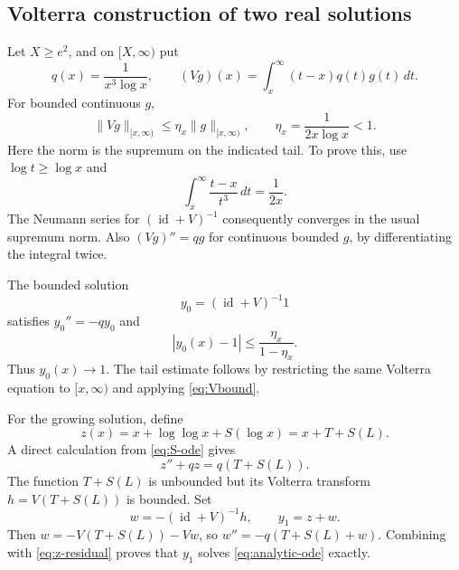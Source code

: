\documentclass[11pt,a4paper]{article}
\numberwithin{equation}{section}
\theoremstyle{definition}
\theoremstyle{remark}
\newcommand{\id}{\operatorname{id}}
\begin{document}
\subsection{Volterra construction of two real solutions}
Let $X\ge e^2$, and on $[X,\infty)$ put
\[
 q(x)=\frac1{x^3\log x},\qquad
 (Vg)(x)=\int_x^\infty(t-x)q(t)g(t)\,dt.
\]
For bounded continuous $g$,
\begin{equation}
 \|Vg\|_{[x,\infty)}\le\eta_x\|g\|_{[x,\infty)},
 \qquad \eta_x=\frac1{2x\log x}<1.
 \label{eq:Vbound}
\end{equation}
Here the norm is the supremum on the indicated tail. To prove this, use $\log t\ge\log x$ and
\[
 \int_x^\infty\frac{t-x}{t^3}\,dt=\frac1{2x}.
\]
The Neumann series for $(\id+V)^{-1}$ consequently converges in the usual supremum norm. Also $(Vg)''=qg$ for continuous bounded $g$, by differentiating the integral twice.

The bounded solution
\begin{equation}
 y_0=(\id+V)^{-1}1
 \label{eq:y0}
\end{equation}
satisfies $y_0''=-qy_0$ and
\begin{equation}
 |y_0(x)-1|\le\frac{\eta_x}{1-\eta_x}.
 \label{eq:y0-error}
\end{equation}
Thus $y_0(x)\to1$. The tail estimate follows by restricting the same Volterra equation to $[x,\infty)$ and applying \eqref{eq:Vbound}.

For the growing solution, define
\begin{equation}
 z(x)=x+\log\log x+S(\log x)=x+T+S(L).
 \label{eq:z}
\end{equation}
A direct calculation from \eqref{eq:S-ode} gives
\begin{equation}
 z''+qz=q(T+S(L)).
 \label{eq:z-residual}
\end{equation}
The function $T+S(L)$ is unbounded but its Volterra transform
$h=V(T+S(L))$ is bounded. Set
\begin{equation}
 w=-(\id+V)^{-1}h,\qquad y_1=z+w.
 \label{eq:y1}
\end{equation}
Then $w=-V(T+S(L))-Vw$, so $w''=-q(T+S(L)+w)$. Combining with \eqref{eq:z-residual} proves that $y_1$ solves \eqref{eq:analytic-ode} exactly.
\end{document}
